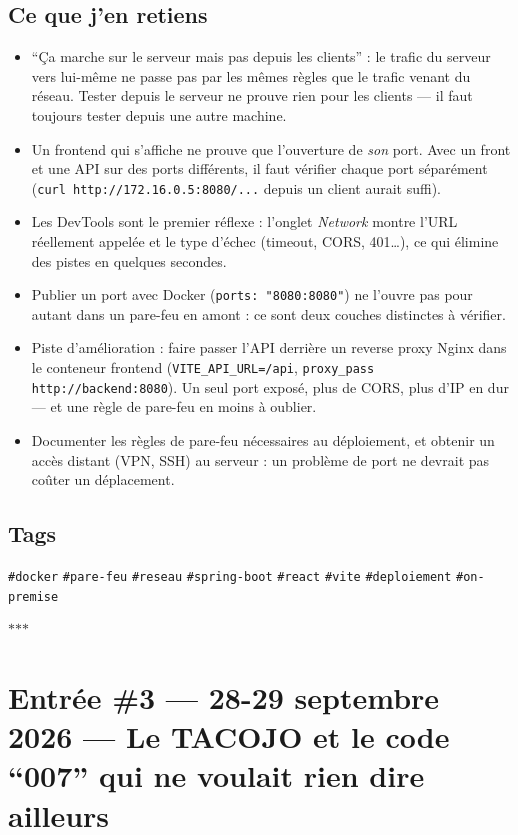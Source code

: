 \documentclass[10pt,twoside,openany]{article}
\newcommand{\entryrule}{\par\vspace{1.2em}\begin{center}\color{accentblue}$\ast$\quad$\ast$\quad$\ast$\end{center}\par}
\newcommand{\tag}[1]{\texttt{\footnotesize\color{tagolive}\#{#1}}}
\begin{document}
\subsection*{Ce que j'en retiens}
\begin{itemize}
  \item \enquote{Ça marche sur le serveur mais pas depuis les clients} : le trafic du serveur vers lui-même ne passe pas par les mêmes règles que le trafic venant du réseau. Tester depuis le serveur ne prouve rien pour les clients --- il faut toujours tester depuis une autre machine.
  \item Un frontend qui s'affiche ne prouve que l'ouverture de \textit{son} port. Avec un front et une API sur des ports différents, il faut vérifier chaque port séparément (\texttt{curl http://172.16.0.5:8080/...} depuis un client aurait suffi).
  \item Les DevTools sont le premier réflexe : l'onglet \textit{Network} montre l'URL réellement appelée et le type d'échec (timeout, CORS, 401\dots), ce qui élimine des pistes en quelques secondes.
  \item Publier un port avec Docker (\texttt{ports: "8080:8080"}) ne l'ouvre pas pour autant dans un pare-feu en amont : ce sont deux couches distinctes à vérifier.
  \item Piste d'amélioration : faire passer l'API derrière un reverse proxy Nginx dans le conteneur frontend (\texttt{VITE\_API\_URL=/api}, \texttt{proxy\_pass http://backend:8080}). Un seul port exposé, plus de CORS, plus d'IP en dur --- et une règle de pare-feu en moins à oublier.
  \item Documenter les règles de pare-feu nécessaires au déploiement, et obtenir un accès distant (VPN, SSH) au serveur : un problème de port ne devrait pas coûter un déplacement.
\end{itemize}

\subsection*{Tags}
\tag{docker} \quad \tag{pare-feu} \quad \tag{reseau} \quad \tag{spring-boot} \quad \tag{react} \quad \tag{vite} \quad \tag{deploiement} \quad \tag{on-premise}

\entryrule

\section{Entrée \#3 --- 28-29 septembre 2026 --- Le TACOJO et le code \enquote{007} qui ne voulait rien dire ailleurs}
\end{document}
